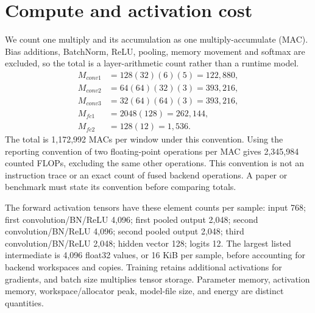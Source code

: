 \documentclass[11pt,a4paper]{article}
\begin{document}
\section{Compute and activation cost}
We count one multiply and its accumulation as one multiply-accumulate (MAC). Bias additions, BatchNorm, ReLU, pooling, memory movement and softmax are excluded, so the total is a layer-arithmetic count rather than a runtime model.
\[
\begin{aligned}
M_{conv1}&=128(32)(6)(5)=122{,}880,\\
M_{conv2}&=64(64)(32)(3)=393{,}216,\\
M_{conv3}&=32(64)(64)(3)=393{,}216,\\
M_{fc1}&=2048(128)=262{,}144,\\
M_{fc2}&=128(12)=1{,}536.
\end{aligned}
\]
The total is 1,172,992 MACs per window under this convention. Using the reporting convention of two floating-point operations per MAC gives 2,345,984 counted FLOPs, excluding the same other operations. This convention is not an instruction trace or an exact count of fused backend operations. A paper or benchmark must state its convention before comparing totals.

The forward activation tensors have these element counts per sample: input 768; first convolution/BN/ReLU 4,096; first pooled output 2,048; second convolution/BN/ReLU 4,096; second pooled output 2,048; third convolution/BN/ReLU 2,048; hidden vector 128; logits 12. The largest listed intermediate is 4,096 float32 values, or 16 KiB per sample, before accounting for backend workspaces and copies. Training retains additional activations for gradients, and batch size multiplies tensor storage. Parameter memory, activation memory, workspace/allocator peak, model-file size, and energy are distinct quantities.
\end{document}

